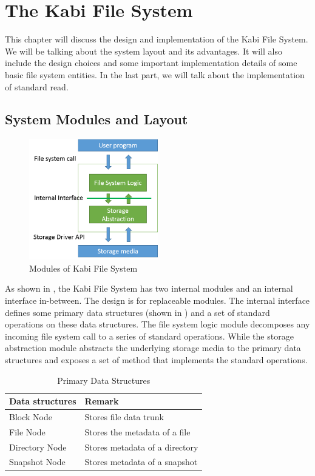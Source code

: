 \chapter{The Kabi File System}
\label{chap:fs}

This chapter will discuss the design and implementation of the Kabi File System. We will be talking about the system layout and its advantages. It will also include the design choices and some important implementation details of some basic file system entities. In the last part, we will talk about the implementation of standard read.

\section{System Modules and Layout}

\begin{figure}[t]
\centering
\includegraphics[width=0.5\textwidth]{Chapter-3/figs/fig8.png}
\caption{Modules of Kabi File System}
\label{fig:modules}
\end{figure}

    As shown in , the Kabi File System has two internal modules and an internal interface in-between. The design is for replaceable modules. The internal interface defines some primary data structures (shown in ) and a set of standard operations on these data structures. The file system logic module decomposes any incoming file system call to a series of standard operations. While the storage abstraction module abstracts the underlying storage media to the primary data structures and exposes a set of method that implements the standard operations.

\begin{table}[t]
\caption{Primary Data Structures}
\label{tab:data_struct}
\begin{center}
\begin{tabular}{ll}
\toprule
Data structures & Remark\\
\midrule
Block Node & Stores file data trunk\\
File Node & Stores the metadata of a file\\
Directory Node & Stores metadata of a directory \\
Snapshot Node & Stores metadata of a snapshot\\
\bottomrule
\end{tabular}
\end{center}
\end{table}

